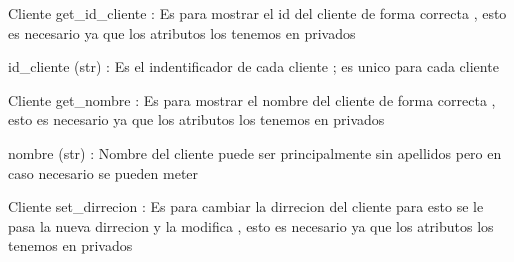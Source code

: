 \documentclass[letterpaper,10pt,spanish]{sphinxmanual}
\begin{document}
\begin{fulllineitems}
\begin{fulllineitems}
\end{fulllineitems}


\begin{fulllineitems}
\label{\detokenize{projects:projects.Clientes.Cliente.get_id_cliente}}
\pysigstartsignatures
{}
\pysigstopsignatures
\sphinxAtStartPar
Cliente get\_id\_cliente : Es para mostrar el id del cliente de forma correcta , esto es necesario ya que los atributos los tenemos en privados
\begin{description}
\sphinxAtStartPar
id\_cliente (str) : Es el indentificador de cada cliente ; es unico para cada cliente

\end{description}

\end{fulllineitems}


\begin{fulllineitems}
\label{\detokenize{projects:projects.Clientes.Cliente.get_nombre}}
\pysigstartsignatures
{}
\pysigstopsignatures
\sphinxAtStartPar
Cliente get\_nombre : Es para mostrar el nombre del cliente de forma correcta , esto es necesario ya que los atributos los tenemos en privados
\begin{description}
\sphinxAtStartPar
nombre (str) : Nombre del cliente puede ser principalmente sin apellidos pero en caso necesario se pueden meter

\end{description}

\end{fulllineitems}


\begin{fulllineitems}
\label{\detokenize{projects:projects.Clientes.Cliente.set_direccion}}
\pysigstartsignatures
{}
\pysigstopsignatures
\sphinxAtStartPar
Cliente set\_dirrecion : Es para cambiar la dirrecion del cliente para esto se le pasa la nueva dirrecion y la modifica , esto es necesario ya que los atributos los tenemos en privados


\end{fulllineitems}
\end{fulllineitems}
\end{document}

